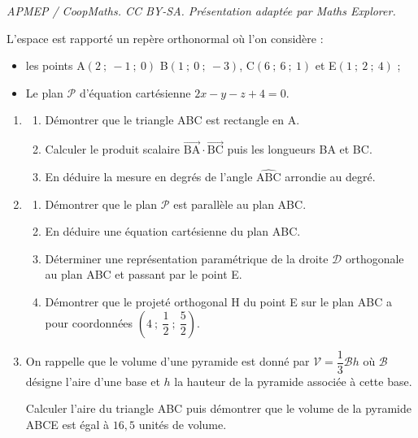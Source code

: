 \documentclass[10pt]{article}
\providecommand{\vect}[1]{\overrightarrow{#1}}
\begin{document}
\noindent\textit{APMEP / CoopMaths. CC BY-SA. Présentation adaptée par Maths Explorer.}\par\medskip
\medskip

L'espace est rapporté un repère orthonormal où l'on considère :

\setlength\parindent{1cm}
\begin{itemize}
\item[$\bullet~~$]les points A$(2~;~-1~;~0)$ B$(1~;~0~;~- 3)$, C$(6~;~6~;~1)$  et E$(1~;~2~;~4)$ ;
\item[$\bullet~~$]Le plan $\mathcal{P}$ d'équation cartésienne $2x - y - z + 4 = 0$.
\end{itemize}
\setlength\parindent{0cm}

\medskip

\begin{enumerate}
\item
	\begin{enumerate}
		\item Démontrer que le triangle ABC est rectangle en A.
		\item Calculer le produit scalaire $\vect{\text{BA}} \cdot \vect{\text{BC}}$ puis les longueurs BA et BC.
		\item En déduire la mesure en degrés de l'angle $\widehat{\text{ABC}}$ arrondie au degré.
	\end{enumerate}
\item
	\begin{enumerate}
		\item Démontrer que le plan $\mathcal{P}$ est parallèle au plan ABC.
		\item En déduire une équation cartésienne du plan ABC.
		\item Déterminer une représentation paramétrique de la droite $\mathcal{D}$ orthogonale au plan ABC et passant par le point E.
		\item Démontrer que le projeté orthogonal H  du point E sur le plan ABC a pour coordonnées $\left(4~;~\dfrac{1}{2}~;~\dfrac{5}{2}\right)$.
	\end{enumerate}
\item On rappelle que le volume d'une pyramide est donné par $\mathcal{V} = \dfrac13 \mathcal{B}h$ où $\mathcal{B}$ désigne l'aire d'une base et $h$  la hauteur de la pyramide associée à cette base.

Calculer l'aire du triangle ABC puis démontrer que le volume de la pyramide ABCE est égal à $16,5$ unités de volume.
\end{enumerate}
\end{document}
